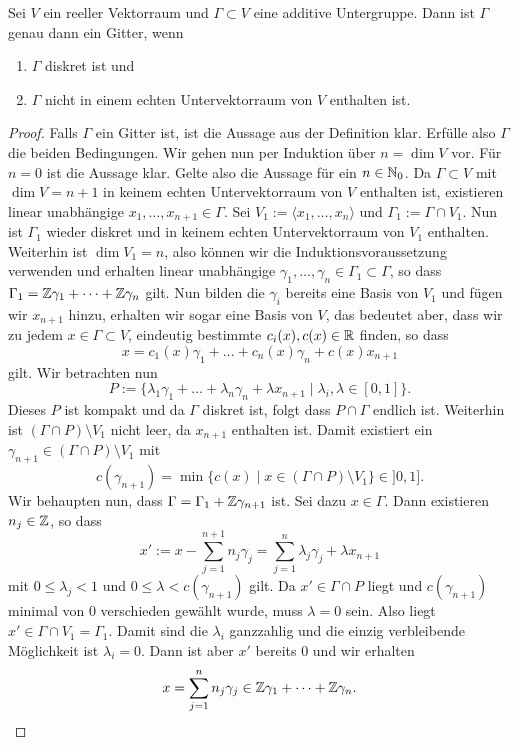 \begin{lemma}
  \label{lemma:gitter}
  Sei $V$ ein reeller Vektorraum und $\Gamma \subset V$ eine additive
  Untergruppe. Dann ist $\Gamma$ genau dann ein Gitter, wenn
  \begin{enumerate}
  \item $\Gamma$ diskret ist und
  \item $\Gamma$ nicht in einem echten Untervektorraum von $V$
    enthalten ist.
  \end{enumerate}
\end{lemma}

\begin{proof}
  Falls $\Gamma$ ein Gitter ist, ist die Aussage aus der Definition
  klar. Erfülle also $\Gamma$ die beiden Bedingungen. Wir gehen nun
  per Induktion über $n = \dim V$ vor. Für $n = 0$ ist die Aussage klar. Gelte also die
  Aussage für ein $n \in \mathbb{N}_0$. Da $\Gamma \subset V$ mit $\dim V =
  n+1$ in keinem echten
  Untervektorraum von $V$ enthalten ist, existieren linear unabhängige $x_1, \dots,
  x_{n+1} \in \Gamma$. Sei $V_1 := \langle x_1, \dots, x_n \rangle$
  und $\Gamma_1 := \Gamma \cap V_1$. Nun ist $\Gamma_1$ wieder diskret
  und in keinem echten Untervektorraum von $V_1$ enthalten. Weiterhin
  ist $\dim V_1 = n$, also können wir die Induktionsvoraussetzung
  verwenden und erhalten linear unabhängige $\gamma_1, \dots, \gamma_n
  \in \Gamma_1 \subset \Gamma$, so dass $\Gamma_1 = \mathbb{Z} \gamma_1 +
  \dots + \mathbb{Z} \gamma_n$ gilt. Nun bilden die $\gamma_i$ bereits eine
  Basis von $V_1$ und fügen wir $x_{n+1}$ hinzu, erhalten wir sogar eine Basis
  von $V$, das bedeutet aber, dass wir zu jedem $x \in \Gamma \subset
  V$, eindeutig bestimmte $c_i(x), c(x) \in \mathbb{R}$ finden, so dass
  \[
  x = c_1(x) \gamma_1 + \dots + c_n(x) \gamma_n + c(x) x_{n+1}
  \]
  gilt. Wir betrachten nun
  \[
  P := \{ \lambda_1 \gamma_1 + \dots + \lambda_n \gamma_n + \lambda
  x_{n+1} \mid \lambda_i, \lambda \in [0,1] \}.
  \]
  Dieses $P$ ist kompakt und da $\Gamma$ diskret ist, folgt dass $P
  \cap \Gamma$ endlich ist. Weiterhin ist \break$( \Gamma \cap P) \setminus
  V_1$ nicht leer, da $x_{n+1}$ enthalten ist. Damit existiert ein
  $\gamma_{n+1} \in ( \Gamma \cap P) \setminus V_1$ mit
  \[
  c(\gamma_{n+1}) = \min \{ c(x) \mid x \in ( \Gamma \cap P ) \setminus
  V_1 \} \in ]0, 1].
  \]
  Wir behaupten nun, dass $\Gamma = \Gamma_1 + \mathbb{Z} \gamma_{n+1}$ ist. Sei
  dazu $x \in \Gamma$. Dann existieren $n_j \in \mathbb{Z}$, so dass
  \[
  x' := x - \sum_{j=1}^{n+1} n_j \gamma_j = \sum_{j=1}^n \lambda_j
  \gamma_j + \lambda x_{n+1}
  \]
  mit $0 \leq \lambda_j < 1$ und $0 \leq \lambda < c(\gamma_{n+1})$
  gilt. Da $x' \in \Gamma \cap P$ liegt und $c(\gamma_{n+1})$ minimal
  von 0 verschieden gewählt wurde, muss $\lambda = 0$ sein. Also liegt
  $x' \in \Gamma \cap V_1 = \Gamma_1$. Damit sind die $\lambda_i$
  ganzzahlig und die einzig verbleibende Möglichkeit ist $\lambda_i =
  0$. Dann ist aber $x'$ bereits 0 und wir erhalten 
  \[
  x = \sum_{j=1}^n n_j \gamma_j \in \mathbb{Z} \gamma_1 + \dots + \mathbb{Z} \gamma_n.
  \]
\end{proof}

